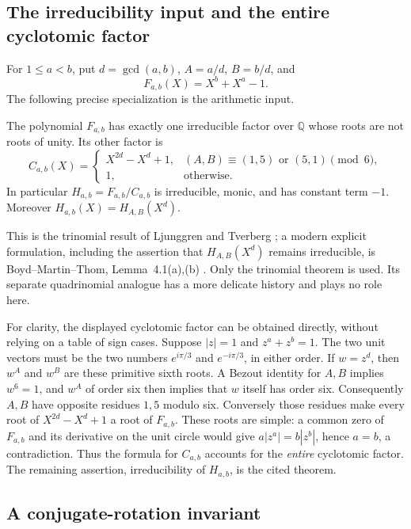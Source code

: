 \subsection{The irreducibility input and the entire cyclotomic factor}

For $1\le a<b$, put $d=\gcd(a,b)$, $A=a/d$, $B=b/d$, and
\[
F_{a,b}(X)=X^b+X^a-1.
\]
The following precise specialization is the arithmetic input.

\begin{theorem}
\label{thm:trinomial-input}
The polynomial $F_{a,b}$ has exactly one irreducible factor over
$\mathbb Q$ whose roots are not roots of unity.  Its other factor is
\[
C_{a,b}(X)=
\begin{cases}
 X^{2d}-X^d+1,&(A,B)\equiv(1,5)\text{ or }(5,1)\pmod6,\\
 1,&\text{otherwise}.
\end{cases}
\]
In particular $H_{a,b}=F_{a,b}/C_{a,b}$ is irreducible, monic,
and has constant term $-1$.  Moreover
$H_{a,b}(X)=H_{A,B}(X^d)$.
\end{theorem}

This is the trinomial result of Ljunggren and Tverberg
\cite{Ljunggren1960,Tverberg1960}; a modern explicit formulation,
including the assertion that $H_{A,B}(X^d)$ remains irreducible, is
Boyd--Martin--Thom, Lemma~4.1(a),(b) \cite{BoydMartinThom2015}.
Only the trinomial theorem is used.  Its separate quadrinomial analogue
has a more delicate history and plays no role here.

For clarity, the displayed cyclotomic factor can be obtained directly,
without relying on a table of sign cases.  Suppose $|z|=1$ and
$z^a+z^b=1$.  The two unit vectors must be the two numbers
$e^{i\pi/3}$ and $e^{-i\pi/3}$, in either order.  If $w=z^d$, then
$w^A$ and $w^B$ are these primitive sixth roots.  A Bezout identity for
$A,B$ implies $w^6=1$, and $w^A$ of order six then implies that $w$
itself has order six.  Consequently $A,B$ have opposite residues
$1,5$ modulo six.  Conversely those residues make every root of
$X^{2d}-X^d+1$ a root of $F_{a,b}$.  These roots are simple: a common
zero of $F_{a,b}$ and its derivative on the unit circle would give
$a|z^a|=b|z^b|$, hence $a=b$, a contradiction.  Thus the formula for
$C_{a,b}$ accounts for the \emph{entire} cyclotomic factor.  The
remaining assertion, irreducibility of $H_{a,b}$, is the cited theorem.

\subsection{A conjugate-rotation invariant}

